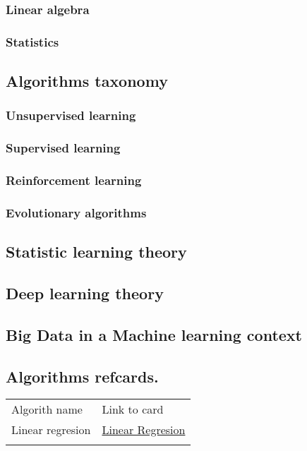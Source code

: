 \documentclass[11pt]{article}
\begin{document}
\subsubsection{Linear algebra}
\label{sec:orged7a6f3}
\subsubsection{Statistics}
\label{sec:orge46d34d}

\subsection{Algorithms taxonomy}
\label{sec:org05a79a6}
\subsubsection{Unsupervised learning}
\label{sec:org51a0f9c}
\subsubsection{Supervised learning}
\label{sec:orgbcd6e02}
\subsubsection{Reinforcement learning}
\label{sec:org6ce370c}
\subsubsection{Evolutionary algorithms}
\label{sec:org57990a9}

\subsection{Statistic learning theory}
\label{sec:org47bc99e}

\subsection{Deep learning theory}
\label{sec:org8385026}

\subsection{Big Data in a Machine learning context}
\label{sec:org453f47b}

\subsection{Algorithms refcards.}
\label{sec:org6245785}

\begin{center}
\begin{tabular}{ll}
Algorith name & Link to card\\
Linear regresion & \href{https://kkaduk.blogspot.com/2019/06/linear-regression-refcard.html}{Linear Regresion}\\
 & \\
\end{tabular}
\end{center}
\end{document}
